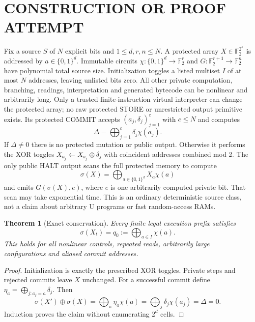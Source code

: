 \documentclass[11pt]{article}
\newtheorem{theorem}{Theorem}
\begin{document}
\section{CONSTRUCTION OR PROOF ATTEMPT}
Fix a source $S$ of $N$ explicit bits and $1\le d,r,n\le N$. A protected array $X\in\mathbb F_2^{2^d}$ is addressed by $a\in\{0,1\}^d$. Immutable circuits $\chi:\{0,1\}^d\to\mathbb F_2^r$ and $G:\mathbb F_2^{r+1}\to\mathbb F_2^n$ have polynomial total source size. Initialization toggles a listed multiset $I$ of at most $N$ addresses, leaving unlisted bits zero. All other private computation, branching, readings, interpretation and generated bytecode can be nonlinear and arbitrarily long. Only a trusted finite-instruction virtual interpreter can change the protected array; no raw protected STORE or unrestricted output primitive exists. Its protected COMMIT accepts $(a_j,\delta_j)_{j=1}^{c}$ with $c\le N$ and computes
\[
\Delta=\bigoplus_{j=1}^{c}\delta_j\chi(a_j).
\]
If $\Delta\ne0$ there is no protected mutation or public output. Otherwise it performs the XOR toggles $X_{a_j}\leftarrow X_{a_j}\oplus\delta_j$ with coincident addresses combined mod 2. The only public HALT output scans the full protected memory to compute
\[
\sigma(X)=\bigoplus_{a\in\{0,1\}^{d}}X_a\chi(a)
\]
and emits $G(\sigma(X),e)$, where $e$ is one arbitrarily computed private bit. That scan may take exponential time. This is an ordinary deterministic source class, not a claim about arbitrary U programs or fast random-access RAMs.

\begin{theorem}[Exact conservation]
Every finite legal execution prefix satisfies
\[
\sigma(X_t)=q_0:=\bigoplus_{a\in I}\chi(a).
\]
This holds for all nonlinear controls, repeated reads, arbitrarily large configurations and aliased commit addresses.
\end{theorem}
\begin{proof}
Initialization is exactly the prescribed XOR toggles. Private steps and rejected commits leave $X$ unchanged. For a successful commit define $\eta_a=\bigoplus_{j:a_j=a}\delta_j$. Then
\[
\sigma(X')\oplus\sigma(X)=\bigoplus_a\eta_a\chi(a)
=\bigoplus_j\delta_j\chi(a_j)=\Delta=0.
\]
Induction proves the claim without enumerating $2^d$ cells.
\end{proof}
\end{document}
